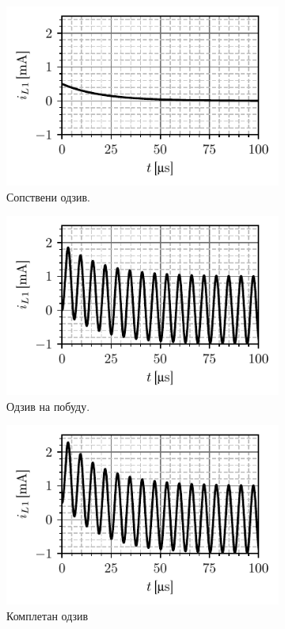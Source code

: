 \begin{figure}[ht!]
    \hspace*{0pt}\hfill
    \begin{subfigure}[t]{0.45\textwidth}
        \centering
        \includegraphics[scale=1]{fig/vrste_rl_1.pdf}
        \caption{Сопствени одзив.}
    \end{subfigure}
    \hspace*{0pt}\hfill
    \begin{subfigure}[t]{0.45\textwidth}
        \centering
        \includegraphics[scale=1]{fig/vrste_rl_2.pdf}
        \caption{Одзив на побуду.}
    \end{subfigure}
    \hfill
    \hspace*{0pt}

    \hspace*{0pt}\hfill
    \begin{subfigure}[t]{0.45\textwidth}
        \centering
        \includegraphics[scale=1]{fig/vrste_rl_3.pdf}
        \caption{Комплетан одзив}
    \end{subfigure}
    \hfill
    \hspace*{0pt}

    \caption{}
    \label{fig:\ID.2}
\end{figure}


